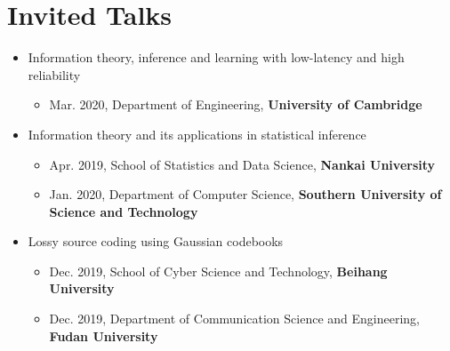 \documentclass[12pt]{article} %
\begin{document}
\section{Invited Talks}
\begin{itemize}
\item Information theory, inference and learning with low-latency and high reliability
\begin{itemize}
\item Mar. 2020, Department of Engineering, \textbf{University of Cambridge}
\end{itemize}

\item Information theory and its applications in statistical inference
\begin{itemize}
\item Apr. 2019, School of Statistics and Data Science, \textbf{Nankai University}
\item Jan. 2020, Department of Computer Science, \textbf{Southern University of Science and Technology}
\end{itemize}
\item Lossy source coding using Gaussian codebooks
\begin{itemize}
\item Dec. 2019, School of Cyber Science and Technology, \textbf{Beihang University}
\item Dec. 2019, Department of Communication Science and Engineering, \textbf{Fudan University}
\end{itemize}

\end{itemize}
\end{document}
